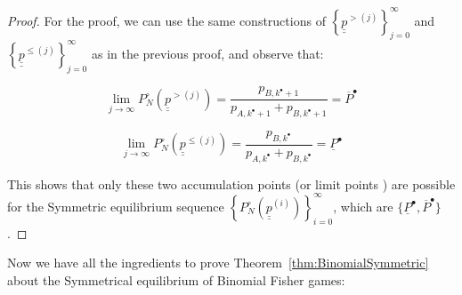 \documentclass{article}
\theoremstyle{definition}
\begin{document}
\begin{proof}
    For the proof, we can use the same constructions of 
     $\left \{ \underline{\underline{p}}^{> (j)} \right \}_{j=0}^\infty$ and
     $\left \{ \underline{\underline{p}}^{\le (j)} \right \}_{j=0}^\infty$ as in the previous proof, and observe that:

     \begin{equation}
         \lim_{j\to\infty} P^\circ_N (\underline{\underline{p}}^{> (j)}) = 
        \frac{p_{B,k^\bullet+1} }
        {p_{A,k^\bullet+1}+p_{B,k^\bullet+1}} = \overline{P}^\bullet
     \end{equation}

     \begin{equation}
         \lim_{j\to\infty} P^\circ_N (\underline{\underline{p}}^{\le (j)}) = 
        \frac{p_{B,k^\bullet} }
        {p_{A,k^\bullet}+p_{B,k^\bullet}} = \underline{P}^\bullet
     \end{equation}

     This shows that only these two accumulation points (or limit points \cite{book:Rudin}) are possible for the Symmetric equilibrium sequence $\left \{ P^\circ_N(\underline{\underline{p}}^{(i)}) \right \}_{i=0}^\infty$, which are $\{\underline{P}^\bullet, \overline{P}^\bullet\}$.
     
\end{proof}


Now we have all the ingredients to prove Theorem~\ref{thm:BinomialSymmetric} about the Symmetrical equilibrium of Binomial Fisher games:
\end{document}
